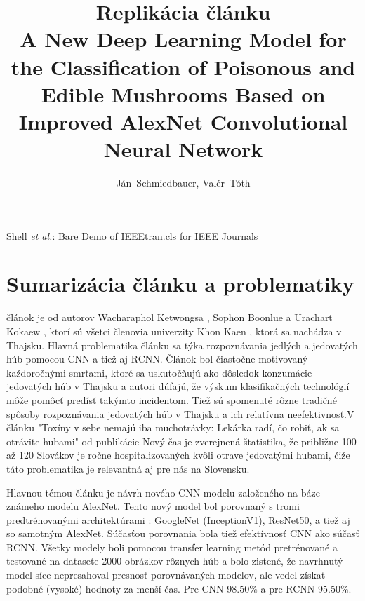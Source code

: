 \documentclass[journal,onecolumn]{IEEEtran}
\begin{document}
\title{Replikácia článku\\ A New Deep Learning Model for the Classification of
Poisonous and Edible Mushrooms Based on Improved AlexNet
Convolutional Neural Network}

\author{Ján~Schmiedbauer,
        Valér~Tóth}


%
{Shell \MakeLowercase{\textit{et al.}}: Bare Demo of IEEEtran.cls for IEEE Journals}

\maketitle
\IEEEpeerreviewmaketitle

\section{Sumarizácia článku a problematiky}

 článok \cite{pc} je od autorov Wacharaphol Ketwongsa \cite{wk}, Sophon Boonlue a Urachart Kokaew \cite{uk}, ktorí sú všetci členovia univerzity Khon Kaen \cite{kk}, ktorá sa nachádza v Thajsku. Hlavná problematika článku sa týka rozpoznávania jedlých a jedovatých húb pomocou CNN a tiež aj RCNN. Článok bol čiastočne motivovaný každoročnými smrťami, ktoré sa uskutočňujú ako dôsledok konzumácie jedovatých húb v Thajsku a autori dúfajú, že výskum klasifikačných technológií môže pomôcť predísť takýmto incidentom. Tiež sú spomenuté rôzne tradičné spôsoby rozpoznávania jedovatých húb v Thajsku a ich relatívna neefektivnosť.V článku "Toxíny v sebe nemajú iba muchotrávky: Lekárka radí, čo robiť, ak sa otrávite hubami" \cite{nc} od publikácie Nový čas je zverejnená štatistika, že približne 100 až 120 Slovákov je ročne hospitalizovaných kvôli otrave jedovatými hubami, čiže táto problematika je relevantná aj pre nás na Slovensku.

\IEEEPARstart{}{}
Hlavnou témou článku je návrh nového CNN modelu založeného na báze známeho modelu AlexNet. Tento nový model bol porovnaný s tromi predtrénovanými architektúrami : GoogleNet (InceptionV1), ResNet50, a tiež aj so samotným AlexNet. Súčasťou porovnania bola tiež efektívnosť CNN ako súčasť RCNN. Všetky modely boli pomocou transfer learning metód pretrénované a testované na datasete 2000 obrázkov rôznych húb a bolo zistené, že navrhnutý model síce nepresahoval presnosť porovnávaných modelov, ale vedel získať podobné (vysoké) hodnoty za menší čas. Pre CNN 98.50\% a pre RCNN 95.50\%.
\end{document}
